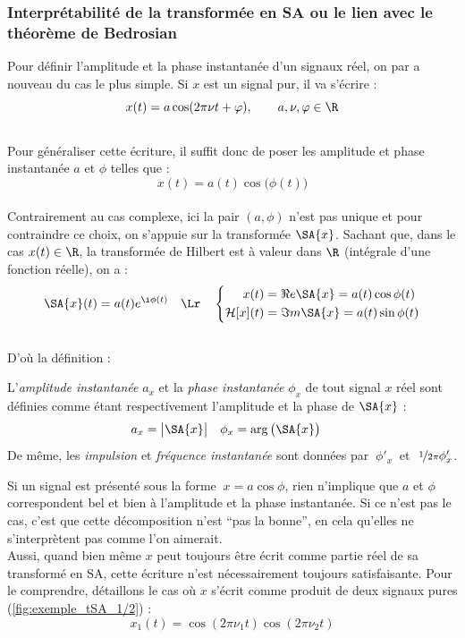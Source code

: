 \subsubsection{\wip Interprétabilité de la transformée en SA ou le lien avec le théorème de Bedrosian}\label{ann:bedrosian}

Pour définir l'amplitude et la phase instantanée d'un signaux réel, on par a nouveau du cas le plus simple. Si $x$ est un signal pur, il va s'écrire :
\[x(t) = a \cos(2\pi\nu t + \varphi),\qquad a,\nu,\varphi\in\R\]
\\
Pour généraliser cette écriture, il suffit donc de poser les amplitude et phase instantanée $a$ et $\phi$ telles que :
\[x(t) = a(t) \cos\big( \phi(t) \big)\]
\\
Contrairement au cas complexe, ici la pair $(a,\phi)$ n'est pas unique et pour contraindre ce choix, on s'appuie sur la transformée $\SA{x}$. Sachant que, dans le cas $x(t)\in\R$, la transformée de Hilbert est à valeur dans $\R$ (intégrale d'une fonction réelle), on a :
\[\SA{x}(t) = a(t)e^{\i \phi(t)}\quad \Lr\quad \left\{\begin{aligned}x(t) &= \Re e \SA{x} = a(t) \cos\phi(t) \\ \mathcal{H}[x](t) &= \Im m \SA{x} = a(t) \sin\phi(t)
\end{aligned}\right.\]
\\
D'où la définition :
\begin{definition}\label{def:ampli-phase_instant}
	L'\emph{amplitude instantanée} $a_x$ et la \emph{phase instantanée} $\phi_x$ de tout signal $x$ réel sont définies comme étant respectivement l'amplitude et la phase de $\SA{x}$ :
	\begin{align}\label{eq:ampli-phase_instant}
		a_x &= \big|\SA{x}\big|   &   \phi_x &= \arg\big(\SA{x}\big)
	\end{align}
	De même, les \emph{impulsion} et \emph{fréquence instantanée} sont données par $\ \phi'_x\ $ et $\ \nicefrac{1}{2\pi}\phi_x'$.
\end{definition}
\skipl

Si un signal est présenté sous la forme  $\ x=a\cos\phi$, rien n'implique que $a$ et $\phi$ correspondent bel et bien à l'amplitude et la phase instantanée. Si ce n'est pas le cas, c'est que cette décomposition n'est ``pas la bonne'', en cela qu'elles ne s’interprètent pas comme l'on aimerait.
\\
Aussi, quand bien même $x$ peut toujours être écrit comme partie réel de sa transformé en SA, cette écriture n'est nécessairement toujours satisfaisante. Pour le comprendre, détaillons le cas où $x$ s'écrit comme produit de deux signaux pures (\cref{fig:exemple_tSA_1/2}) :
\[x_1(t) = \cos (2\pi\nu_1t)\cos (2\pi\nu_2t)\]

